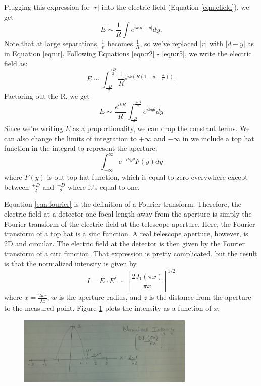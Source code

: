 \begin{enumerate}
      Plugging this expression for $|r|$ into the electric field (Equation \ref{eqn:efield}), we get
      \begin{equation}
      E \sim \frac{1}{R} \int e^{i k |d-y|} dy.
      \end{equation}
      Note that at large separations, $\frac{1}{r}$ becomes $\frac{1}{R}$, so we've replaced $|r|$ with $|d-y|$ as in Equation \ref{eqn:r}. Following Equations \ref{eqn:r2} - \ref{eqn:r5}, we write the electric field as:
      \begin{equation}
      E \sim \int^{\frac{+D}{2}}_{\frac{-D}{2}} \frac{1}{R} e^{i k (R(1-y-\frac{\theta}{R}))}.
      \end{equation}
      Factoring out the R, we get
      \begin{equation}
      E \sim \frac{e^{ikR}}{R} \int^{\frac{+D}{2}}_{\frac{-D}{2}} e^{iky\theta} dy
      \end{equation}
      Since we're writing $E$ as a proportionality, we can drop the constant terms. We can also change the limits of integration to $+\infty$ and $-\infty$ in we include a top hat function in the integral to represent the aperture:
      \begin{equation}
      \int^{\infty}_{-\infty} e^{-iky \theta} F(y) dy
      \label{eqn:fourier}
      \end{equation}
      where $F(y)$ is out top hat function, which is equal to zero everywhere except between $\frac{+D}{2}$ and $\frac{-D}{2}$ where it's equal to one.
      
      Equation \ref{eqn:fourier} is the definition of a Fourier transform. Therefore, the electric field at a detector one focal length away from the aperture is simply the Fourier transform of the electric field at the telescope aperture. Here, the Fourier transform of a top hat is a sinc function. A real telescope aperture, however, is 2D and circular. The electric field at the detector is then given by the Fourier transform of a circ function. That expression is pretty complicated, but the result is that the normalized intensity is given by
      \begin{equation}
      I = E \cdot E^{*} \sim \left [ \frac{2 J_{1} (\pi x)}{\pi x} \right ]^{1/2}
      \end{equation}
      where $x = \frac{2 w r}{\lambda z}$, $w$ is the aperture radius, and $z$ is the distance from the aperture to the measured point. Figure \ref{fig:intensity} plots the intensity as a function of $x$.
      
      \begin{figure}[h]
      \centering
      \includegraphics[width=0.75\textwidth, angle=180]{circ.jpg}
      \label{fig:intensity}
      \end{figure} 
      

\end{enumerate}
